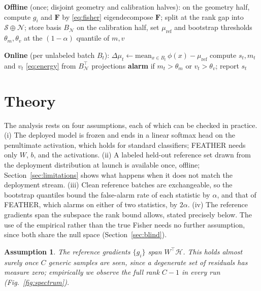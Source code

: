 \documentclass[conference]{IEEEtran}
\newtheorem{assumption}{Assumption}
\newcommand{\F}{\mathbf{F}}
\newcommand{\act}{\phi}
\begin{document}
\begin{algorithm}[t]
\caption{FEATHER calibration and streaming monitoring}
\label{alg:feather}
\begin{algorithmic}[1]
\item[] \textbf{Offline} (once; disjoint geometry and calibration halves):
\STATE on the geometry half, compute $g_i$ and $\F$ by \eqref{eq:fisher}
\STATE eigendecompose $\F$; split at the rank gap into
       $\mathcal{S} \oplus \mathcal{N}$; store basis $B_\mathcal{N}$
\STATE on the calibration half, set $\mu_{\mathrm{ref}}$ and bootstrap
       thresholds $\theta_m, \theta_v$ at the $(1-\alpha)$ quantile of $m, v$
\item[] \textbf{Online} (per unlabeled batch $B_t$):
\STATE $\Delta\mu_t \leftarrow \mathrm{mean}_{x \in B_t}\,\act(x) - \mu_{\mathrm{ref}}$
\STATE compute $s_t, m_t$ and $v_t$ \eqref{eq:energy} from $B_\mathcal{N}^\top$ projections
\STATE \textbf{alarm} if $m_t > \theta_m$ or $v_t > \theta_v$; report $s_t$
\end{algorithmic}
\end{algorithm}

\section{Theory}
\label{sec:theory}

The analysis rests on four assumptions, each of which can be checked in
practice. (i) The deployed model is frozen and ends in a linear softmax head
on the penultimate activation, which holds for standard classifiers; FEATHER
needs only $W$, $b$, and the activations. (ii) A labeled held-out reference
set drawn from the deployment distribution at launch is available once,
offline; Section~\ref{sec:limitations} shows what happens when it does not
match the deployment stream. (iii) Clean reference batches are exchangeable,
so the bootstrap quantiles bound the false-alarm rate of each statistic by
$\alpha$, and that of FEATHER, which alarms on either of two statistics, by
$2\alpha$. (iv) The reference gradients span the subspace the rank bound
allows, stated precisely below. The use of the empirical rather than the true
Fisher needs no further assumption, since both share the null space
(Section~\ref{sec:blind}).

\begin{assumption}
\label{ass:span}
The reference gradients $\{g_i\}$ span $W^\top\!\mathcal{H}$. This holds
almost surely once $C$ generic samples are seen, since a degenerate set of
residuals has measure zero; empirically we observe the full rank $C-1$ in
every run (Fig.~\ref{fig:spectrum}).
\end{assumption}
\end{document}
